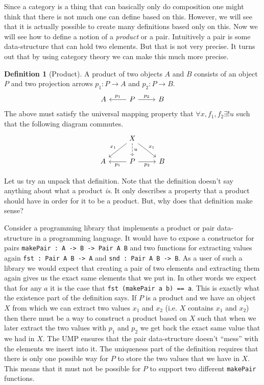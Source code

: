 \documentclass{book}
\theoremstyle{definition}
\newtheorem{definition}{Definition}[section]
\newcommand{\arr}[3]{#1 : #2 \rightarrow #3}
\begin{document}
Since a category is a thing that can basically only do composition one might
think that there is not much one can define based on this. However, we will see
that it is actually possible to create many definitions based only on this. Now
we will see how to define a notion of a \emph{product} or a pair. Intuitively a
pair is some data-structure that can hold two elements. But that is not very
precise. It turns out that by using category theory we can make this much more
precise.

\begin{definition}[Product]
  A product of two objects $A$ and $B$ consists of an object $P$ and two
  projection arrows $\arr{p_1}{P}{A}$ and $\arr{p_2}{P}{B}$.
  \[
    \begin{tikzcd}
      A & P \arrow[l, "p_1"'] \arrow[r, "p_2"] & B
    \end{tikzcd}
  \]
  The above must satisfy the universal mapping property that
  $\forall x, f_1, f_2 \exists! u$ such that the following diagram commutes.
  \[
    \begin{tikzcd}
      & X \arrow[ld, "x_1"'] \arrow[d, dashrightarrow, "u"] \arrow[rd, "x_1"] \\
      A & P \arrow[l, "p_1"] \arrow[r, "p_2"'] & B
    \end{tikzcd}
  \]
\end{definition}

Let us try an unpack that definition. Note that the definition doesn't say
anything about what a product \emph{is}. It only describes a property that a
product should have in order for it to be a product. But, why does that
definition make sense?

Consider a programming library that implements a product or pair data-structure
in a programming language. It would have to expose a constructor for pairs
\texttt{makePair : A -> B -> Pair A B} and two functions for extracting values
again \texttt{fst : Pair A B -> A} and \texttt{snd : Pair A B -> B}. As a user
of such a library we would expect that creating a pair of two elements and
extracting them again gives us the exact same elements that we put in. In other
words we expect that for any $a$ it is the case that \texttt{fst (makePair a b)
  == a}. This is exactly what the existence part of the definition says. If $P$
is a product and we have an object $X$ from which we can extract two values
$x_1$ and $x_2$ (i.e. $X$ contains $x_1$ and $x_2$) then there must be a way to
construct a product based on $X$ such that when we later extract the two values
with $p_1$ and $p_2$ we get back the exact same value that we had in $X$. The
UMP ensures that the pair data-structure doesn't ``mess'' with the elements we
insert into it. The uniqueness part of the definition requires that there is
only one possible way for $P$ to store the two values that we have in $X$. This
means that it must not be possible for $P$ to support two different
\texttt{makePair} functions.
\end{document}
